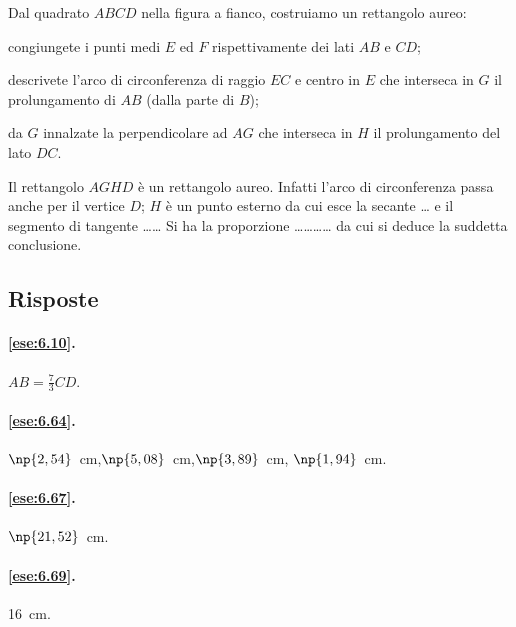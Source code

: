 \noindent\begin{minipage}{0.7\textwidth}\parindent15pt
\begin{esercizio}
\label{ese:6.112}
Dal quadrato $ABCD$ nella figura a fianco, costruiamo un rettangolo 
aureo:
\begin{enumerate*}
\item congiungete i punti medi $E$ ed $F$ rispettivamente dei lati 
$AB$ e $CD$;
\item descrivete l'arco di circonferenza di raggio $EC$ e centro in 
$E$ che interseca in $G$ il prolungamento di $AB$ (dalla parte di 
$B$);
\item da $G$ innalzate la perpendicolare ad $AG$ che interseca in $H$ 
il prolungamento del lato $DC$.
\end{enumerate*}
Il rettangolo $AGHD$ è un rettangolo aureo. Infatti l'arco di 
circonferenza passa anche per il vertice $D$; $H$ è un punto esterno 
da cui esce la secante \ldots{} e il segmento di tangente 
\ldots\ldots{}
Si ha la proporzione \ldots\ldots\ldots\ldots{} da cui si deduce la 
suddetta conclusione.
\end{esercizio}
\end{minipage}\hfil
\begin{minipage}{0.3\textwidth}
	\centering
\end{minipage}


\subsection{Risposte}

\begingroup
\hypersetup{linkcolor=black}

\paragraph{\ref{ese:6.10}.}
$AB=\frac{7}{3}CD$.

\paragraph{\ref{ese:6.64}.}
$\np{2,54}$~cm,\quad $\np{5,08}$~cm,\quad $\np{3,89}$~cm,\quad 
$\np{1,94}$~cm.

\paragraph{\ref{ese:6.67}.}
$\np{21,52}$~cm.

\paragraph{\ref{ese:6.69}.}
16~cm.


